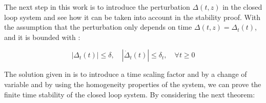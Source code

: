 The next step in this work is to introduce the perturbation \(\Delta(t,z)\) in the closed loop system 
and see how it can be taken into account in the stability proof. With the assumption that the perturbation
only depends on time \(\Delta(t,z) = \Delta_t(t)\), and it is bounded with : 

\begin{equation}
    \label{eq:assumption_perturbation_time_forLagrouche}
    |\Delta_t(t)| \leq \delta, \quad |\dot{\Delta}_t(t)| \leq \delta_t, \quad \forall t \geq 0
\end{equation}

The solution given in \cite{Laghrouche2017} is to introduce a time scaling factor and by a change of
variable and by using the homogeneity properties of the system, we can prove the finite time stability of the
closed loop system. By considering the next theorem:


    


